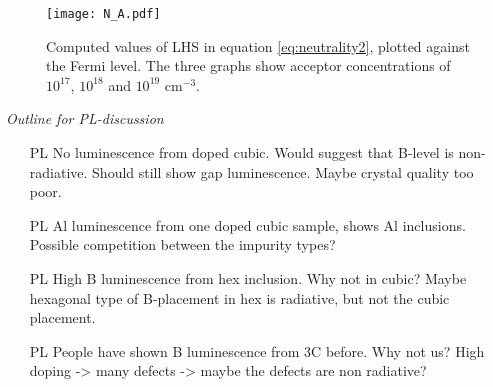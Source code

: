 \begin{figure}[H]
\begin{center}
\texttt{[image: N\_A.pdf]}
\caption{Computed values of LHS in equation \ref{eq:neutrality2}, plotted against the Fermi level. The three graphs show acceptor concentrations of $10^{17}$, $10^{18}$ and $10^{19}$ cm$^{-3}$. 
\label{fig:N_A}}
\end{center}
\end{figure}


\emph{Outline for PL-discussion}

\begin{itemize}
\item[PL] No luminescence from doped cubic. Would suggest that B-level is non-radiative. Should still show gap luminescence. Maybe crystal quality too poor. 
\item[PL] Al luminescence from one doped cubic sample, shows Al inclusions. Possible competition between the impurity types?
\item[PL] High B luminescence from hex inclusion. Why not in cubic? Maybe hexagonal type of B-placement in hex is radiative, but not the cubic placement. 
\item[PL] People have shown B luminescence from 3C before. Why not us? High doping -> many defects -> maybe the defects are non radiative?
\end{itemize}












































